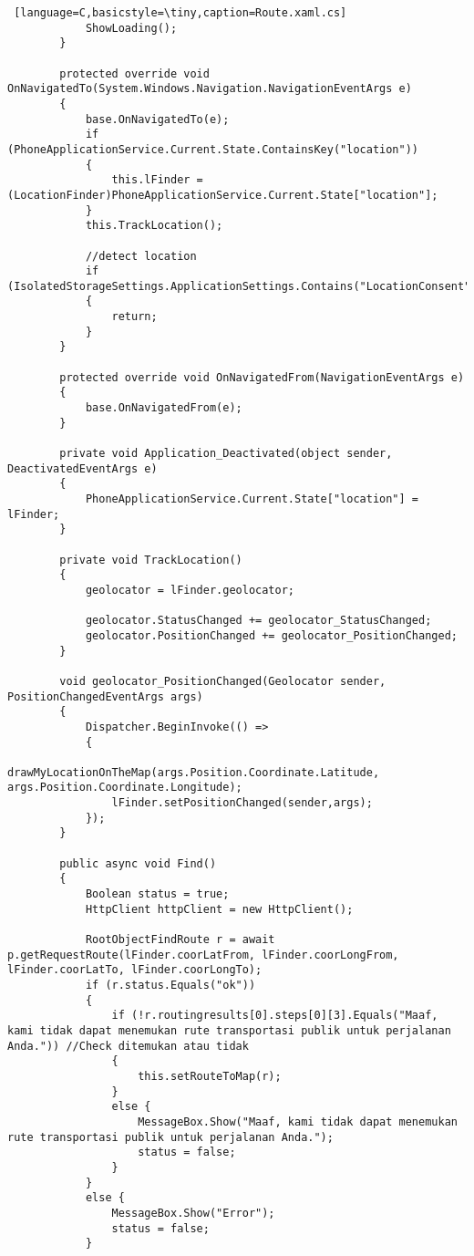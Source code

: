 \begin{lstlisting} [language=C,basicstyle=\tiny,caption=Route.xaml.cs]
            ShowLoading();
        }

        protected override void OnNavigatedTo(System.Windows.Navigation.NavigationEventArgs e)
        {
            base.OnNavigatedTo(e);
            if (PhoneApplicationService.Current.State.ContainsKey("location"))
            {
                this.lFinder = (LocationFinder)PhoneApplicationService.Current.State["location"];
            }
            this.TrackLocation();

            //detect location
            if (IsolatedStorageSettings.ApplicationSettings.Contains("LocationConsent"))
            {
                return;
            }
        }

        protected override void OnNavigatedFrom(NavigationEventArgs e)
        {
            base.OnNavigatedFrom(e);
        }

        private void Application_Deactivated(object sender, DeactivatedEventArgs e)
        {
            PhoneApplicationService.Current.State["location"] = lFinder;
        }

        private void TrackLocation()
        {
            geolocator = lFinder.geolocator;

            geolocator.StatusChanged += geolocator_StatusChanged;
            geolocator.PositionChanged += geolocator_PositionChanged;
        }

        void geolocator_PositionChanged(Geolocator sender, PositionChangedEventArgs args)
        {
            Dispatcher.BeginInvoke(() =>
            {
                drawMyLocationOnTheMap(args.Position.Coordinate.Latitude, args.Position.Coordinate.Longitude);
                lFinder.setPositionChanged(sender,args);
            });
        }

        public async void Find()
        {
            Boolean status = true; 
            HttpClient httpClient = new HttpClient();

            RootObjectFindRoute r = await p.getRequestRoute(lFinder.coorLatFrom, lFinder.coorLongFrom, lFinder.coorLatTo, lFinder.coorLongTo);
            if (r.status.Equals("ok"))
            {
                if (!r.routingresults[0].steps[0][3].Equals("Maaf, kami tidak dapat menemukan rute transportasi publik untuk perjalanan Anda.")) //Check ditemukan atau tidak
                {
                    this.setRouteToMap(r);
                }
                else {
                    MessageBox.Show("Maaf, kami tidak dapat menemukan rute transportasi publik untuk perjalanan Anda.");
                    status = false; 
                }
            }
            else {
                MessageBox.Show("Error");
                status = false; 
            }


\end{lstlisting}
